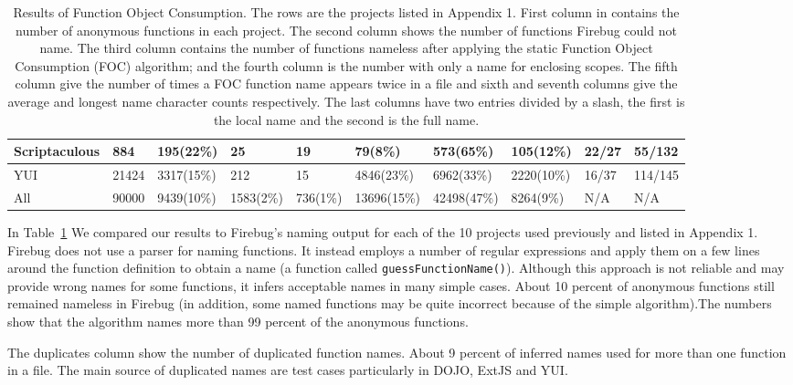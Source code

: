 \documentclass[10pt, preprint]{sigplanconf}
\begin{document}
\begin{table}
{\begin{tabular}{ | l | l | l | l | l | l | l | l | l | l |}
  \hline  
   Scriptaculous & 884       &   195(22\%)    & 25        & 19        &    79(8\%)           &    573(65\%)          & 105(12\%)   & 22/27         & 55/132   \\ 
  \hline    
   YUI           & 21424     &   3317(15\%)   & 212       & 15        &    4846(23\%)        &    6962(33\%)         & 2220(10\%)  & 16/37         & 114/145  \\ 
  \hline 
   All           & 90000     &   9439(10\%)   & 1583(2\%) & 736(1\%)  &    13696(15\%)       &    42498(47\%)        & 8264(9\%)   & N/A            & N/A         \\ 
  \hline       
  \end{tabular}
  }
 \label{evaluation} 
\caption{Results of Function Object Consumption. The rows are the projects listed in Appendix 1. First column in  contains the number of anonymous functions in each project. The second column shows the number of functions Firebug could not name. The third column contains the number of functions nameless after applying the static Function Object Consumption (FOC) algorithm;  and the fourth column is the number with only a name for enclosing scopes. The fifth column give the number of times a FOC function name appears twice in a file and sixth and seventh columns give the average and longest name character counts respectively. The last columns have two entries divided by a slash, the first is the local name and the second is the full name.} 
\end{table}    


In Table~\ref{evaluation} We compared our results to Firebug's naming output for each of the 10 projects used previously and listed in Appendix 1. Firebug does not use a parser for naming functions. It instead employs a number of regular expressions and apply them on a few lines around the function definition to obtain a name  (a function called {\small \texttt{guessFunctionName()}}). Although this approach is not reliable and may provide wrong names for some functions, it infers acceptable names in many simple cases. About 10 percent of anonymous functions still remained nameless in Firebug (in addition, some named functions may be quite incorrect because of the simple algorithm).The numbers show that the algorithm names more than 99 percent of the anonymous functions.


The duplicates column show the number of duplicated function names. About 9 percent of inferred names used for more than one function in a file. The main source of duplicated names are test cases particularly in DOJO, ExtJS and YUI. 
\end{document}
